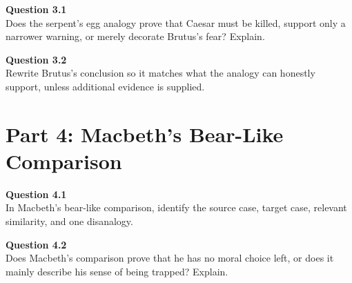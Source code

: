 \documentclass[12pt]{article}
\begin{document}
\textbf{Question 3.1}\\[-0.15em]
Does the serpent's egg analogy prove that Caesar must be killed, support only a narrower warning, or merely decorate Brutus's fear? Explain.


\textbf{Question 3.2}\\[-0.15em]
Rewrite Brutus's conclusion so it matches what the analogy can honestly support, unless additional evidence is supplied.


\newpage

\section*{Part 4: Macbeth's Bear-Like Comparison}

\textbf{Question 4.1}\\[-0.15em]
In Macbeth's bear-like comparison, identify the source case, target case, relevant similarity, and one disanalogy.


\textbf{Question 4.2}\\[-0.15em]
Does Macbeth's comparison prove that he has no moral choice left, or does it mainly describe his sense of being trapped? Explain.

\end{document}
